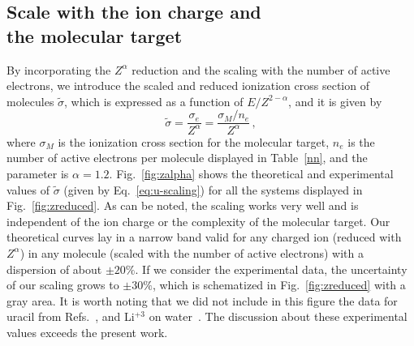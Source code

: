 \documentclass[10pt,showpacs,showkeys,twocolumn]{revtex4-1}
\begin{document}
\subsection{Scale with the ion charge and \\ the molecular target}

By incorporating the $Z^\alpha$ reduction and the scaling with the 
number of active electrons, we introduce the scaled and reduced 
ionization cross section of molecules $\tilde{\sigma}$, which is 
expressed as a function of $E/Z^{2-\alpha}$, and it is given by
\begin{equation}
 \tilde{\sigma}=\frac{\sigma_e}{Z^{\alpha}}=\frac{\sigma_M/n_e}{Z^{\alpha}}\,,
\label{eq:u-scaling}
\end{equation}
where $\sigma_M$ is the ionization cross section for the molecular 
target, $n_e$ is the number of active electrons per molecule displayed 
in Table~\ref{nn}, and the parameter is $\alpha=1.2$. 
Fig.~\ref{fig:zalpha} shows the theoretical and experimental values of 
$\tilde{\sigma}$ (given by Eq.~\ref{eq:u-scaling}) for all the systems 
displayed in Fig.~\ref{fig:zreduced}. As can be noted, the scaling 
works very well and is independent of the ion charge or the complexity 
of the molecular target. Our theoretical curves lay in a narrow band 
valid for any charged ion (reduced with $Z^\alpha$) in any molecule 
(scaled with the number of active electrons) with a dispersion of about 
$\pm 20\%$. If we consider the experimental data, the uncertainty of 
our scaling grows to $\pm 30\%$, which is schematized in 
Fig.~\ref{fig:zreduced} with a gray area. It is worth noting that we 
did not include in this figure the data for uracil from 
Refs.~\cite{agnihotri2012,agnihotri2013}, and Li$^{+3}$ on 
water~\cite{Luna_Li_water}. The discussion about these experimental 
values exceeds the present work. 
\end{document}
